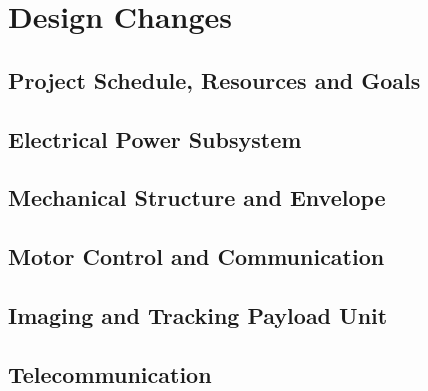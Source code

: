\newpage
\chapter{Design Changes}
\label{chap:design_changes}


\section{Project Schedule, Resources and Goals}

\section{Electrical Power Subsystem}

\section{Mechanical Structure and Envelope}

\section{Motor Control and Communication}

\section{Imaging and Tracking Payload Unit}

\section{Telecommunication}
